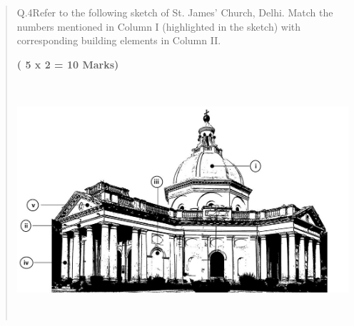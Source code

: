 \documentclass[
]{article}
\begin{document}
\begin{quote}
Q.4Refer to the following sketch of St. James' Church, Delhi. Match the
numbers mentioned in Column I (highlighted in the sketch) with
corresponding building elements in Column II.

\textbf{( 5 x 2 = 10 Marks)}

\includegraphics[width=6.11805in,height=3.4375in]{vertopal_2361032064654423b71b7db67d98c753/media/image11.png}
\end{quote}
\end{document}
